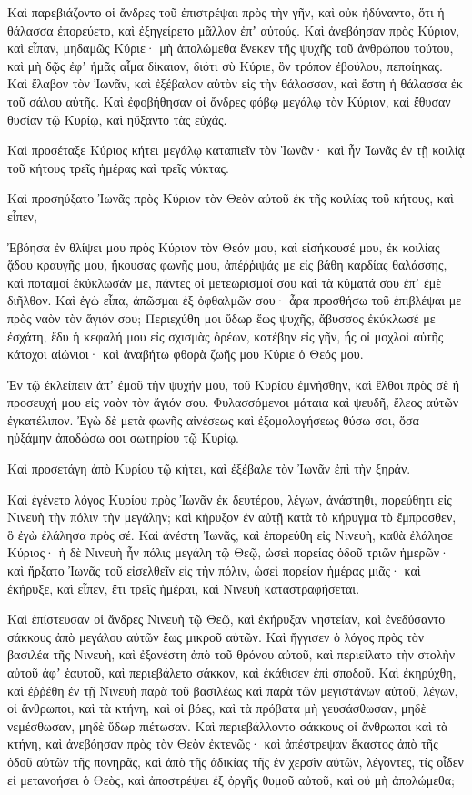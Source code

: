 \begin{spacing}{1.1}
\begin{multicols}{2}
Καὶ παρεβιάζοντο οἱ ἄνδρες τοῦ ἐπιστρέψαι πρὸς τὴν γῆν, καὶ οὐκ ἠδύναντο, ὅτι ἡ θάλασσα ἐπορεύετο, καὶ ἐξηγείρετο μᾶλλον ἐπʼ αὐτούς.
Καὶ ἀνεβόησαν πρὸς Κύριον, καὶ εἶπαν, μηδαμῶς Κύριε· μὴ ἀπολώμεθα ἕνεκεν τῆς ψυχῆς τοῦ ἀνθρώπου τούτου, καὶ μὴ δῷς ἐφʼ ἡμᾶς αἷμα δίκαιον, διότι σὺ Κύριε, ὃν τρόπον ἐβούλου, πεποίηκας.
Καὶ ἔλαβον τὸν Ἰωνᾶν, καὶ ἐξέβαλον αὐτὸν εἰς τὴν θάλασσαν, καὶ ἔστη ἡ θάλασσα ἐκ τοῦ σάλου αὐτῆς.
Καὶ ἐφοβήθησαν οἱ ἄνδρες φόβῳ μεγάλῳ τὸν Κύριον, καὶ ἔθυσαν θυσίαν τῷ Κυρίῳ, καὶ ηὔξαντο τὰς εὐχάς.

Καὶ προσέταξε Κύριος κήτει μεγάλῳ καταπιεῖν τὸν Ἰωνᾶν· καὶ ἦν Ἰωνᾶς ἐν τῇ κοιλίᾳ τοῦ κήτους τρεῖς ἡμέρας καὶ τρεῖς νύκτας.

Καὶ προσηύξατο Ἰωνᾶς πρὸς Κύριον τὸν Θεὸν αὐτοῦ ἐκ τῆς κοιλίας τοῦ κήτους,
καὶ εἶπεν,

Ἐβόησα ἐν θλίψει μου πρὸς Κύριον τὸν Θεόν μου, καὶ εἰσήκουσέ μου, ἐκ κοιλίας ᾅδου κραυγῆς μου, ἤκουσας φωνῆς μου, ἀπέῤῥιψάς με εἰς βάθη καρδίας θαλάσσης,
καὶ ποταμοί ἐκύκλωσάν με, πάντες οἱ μετεωρισμοί σου καὶ τὰ κύματά σου ἐπʼ ἐμὲ διῆλθον.
Καὶ ἐγὼ εἶπα, ἀπῶσμαι ἐξ ὀφθαλμῶν σου· ἆρα προσθήσω τοῦ ἐπιβλέψαι με πρὸς ναὸν τὸν ἅγιόν σου;
Περιεχύθη μοι ὕδωρ ἕως ψυχῆς, ἄβυσσος ἐκύκλωσέ με ἐσχάτη, ἔδυ ἡ κεφαλή μου εἰς σχισμὰς ὀρέων,
κατέβην εἰς γῆν, ἧς οἱ μοχλοὶ αὐτῆς κάτοχοι αἰώνιοι· καὶ ἀναβήτω φθορὰ ζωῆς μου Κύριε ὁ Θεός μου.

Ἐν τῷ ἐκλείπειν ἀπʼ ἐμοῦ τὴν ψυχήν μου, τοῦ Κυρίου ἐμνήσθην, καὶ ἔλθοι πρὸς σὲ ἡ προσευχή μου εἰς ναὸν τὸν ἅγιόν σου.
Φυλασσόμενοι μάταια καὶ ψευδῆ, ἔλεος αὐτῶν ἐγκατέλιπον.
Ἐγὼ δὲ μετὰ φωνῆς αἰνέσεως καὶ ἐξομολογήσεως θύσω σοι, ὅσα ηὐξάμην ἀποδώσω σοι σωτηρίου τῷ Κυρίῳ.

Καὶ προσετάγη ἀπὸ Κυρίου τῷ κήτει, καὶ ἐξέβαλε τὸν Ἰωνᾶν ἐπὶ τὴν ξηράν.

Καὶ ἐγένετο λόγος Κυρίου πρὸς Ἰωνᾶν ἐκ δευτέρου, λέγων,
ἀνάστηθι, πορεύθητι εἰς Νινευὴ τὴν πόλιν τὴν μεγάλην; καὶ κήρυξον ἐν αὐτῇ κατὰ τὸ κήρυγμα τὸ ἔμπροσθεν, ὃ ἐγὼ ἐλάλησα πρὸς σέ.
Καὶ ἀνέστη Ἰωνᾶς, καὶ ἐπορεύθη εἰς Νινευὴ, καθὰ ἐλάλησε Κύριος· ἡ δὲ Νινευὴ ἦν πόλις μεγάλη τῷ Θεῷ, ὡσεὶ πορείας ὁδοῦ τριῶν ἡμερῶν·
καὶ ἤρξατο Ἰωνᾶς τοῦ εἰσελθεῖν εἰς τὴν πόλιν, ὡσεὶ πορείαν ἡμέρας μιᾶς· καὶ ἐκήρυξε, καὶ εἶπεν, ἔτι τρεῖς ἡμέραι, καὶ Νινευὴ καταστραφήσεται.

Καὶ ἐπίστευσαν οἱ ἄνδρες Νινευὴ τῷ Θεῷ, καὶ ἐκήρυξαν νηστείαν, καὶ ἐνεδύσαντο σάκκους ἀπὸ μεγάλου αὐτῶν ἕως μικροῦ αὐτῶν.
Καὶ ἤγγισεν ὁ λόγος πρὸς τὸν βασιλέα τῆς Νινευὴ, καὶ ἐξανέστη ἀπὸ τοῦ θρόνου αὐτοῦ, καὶ περιείλατο τὴν στολὴν αὐτοῦ ἀφʼ ἑαυτοῦ, καὶ περιεβάλετο σάκκον, καὶ ἐκάθισεν ἐπὶ σποδοῦ.
Καὶ ἐκηρύχθη, καὶ ἐῤῥέθη ἐν τῇ Νινευὴ παρὰ τοῦ βασιλέως καὶ παρὰ τῶν μεγιστάνων αὐτοῦ, λέγων, οἱ ἄνθρωποι, καὶ τὰ κτήνη, καὶ οἱ βόες, καὶ τὰ πρόβατα μὴ γευσάσθωσαν, μηδὲ νεμέσθωσαν, μηδὲ ὕδωρ πιέτωσαν.
Καὶ περιεβάλλοντο σάκκους οἱ ἄνθρωποι καὶ τὰ κτήνη, καὶ ἀνεβόησαν πρὸς τὸν Θεὸν ἐκτενῶς· καὶ ἀπέστρεψαν ἕκαστος ἀπὸ τῆς ὁδοῦ αὐτῶν τῆς πονηρᾶς, καὶ ἀπὸ τῆς ἀδικίας τῆς ἐν χερσὶν αὐτῶν, λέγοντες,
τίς οἶδεν εἰ μετανοήσει ὁ Θεὸς, καὶ ἀποστρέψει ἐξ ὀργῆς θυμοῦ αὐτοῦ, καὶ οὐ μὴ ἀπολώμεθα;


\end{multicols}
\end{spacing}

